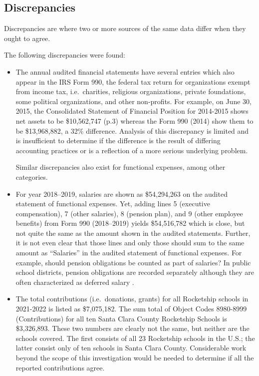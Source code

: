 \newpage
\subsection{Discrepancies}%
\label{sec:discrepancies}\indent%

Discrepancies are where two or more sources of the same data differ when they ought to agree.

The following discrepancies were found:
\begin{itemize}
  \item The annual audited financial statements have several entries which also appear in the IRS Form 990, the federal tax return for organizations exempt from income tax, i.e.\ charities, religious organizations, private foundations, some political organizations, and other non-profits. For example, on June 30, 2015, the Consolidated Statement of Financial Position for 2014-2015 shows net assets to be \$10,562,747 (p.3) whereas the Form 990 (2014) show them to be \$13,968,882, a 32\% difference. Analysis of this discrepancy is limited and is insufficient to determine if the difference is the result of differing accounting practices or is a reflection of a more serious underlying problem.

  Similar discrepancies also exist for functional expenses, among other categories.
 \item For year 2018–2019, salaries are shown as \$54,294,263 on the audited statement of functional expenses. Yet, adding lines 5 (executive compensation), 7 (other salaries), 8 (pension plan), and 9 (other employee benefits) from Form 990 (2018–2019) yields \$54,516,782 which is close, but not quite the same as the amount shown in the audited statements. Further, it is not even clear that those lines and only those should sum to the same amount as ``Salaries'' in the audited statement of functional expenses.  For example, should pension obligations be counted as part of salaries? In public school districts, pension obligations are recorded separately although they are often characterized as deferred salary \parencite{Kagan2022}. 

  \item The total contributions (i.e.\ donations, grants) for all Rocketship schools in 2021-2022 is listed as \$7,075,182. The sum total of Object Codes 8980-8999 (Contributions) for all ten Santa Clara County Rocketship Schools is \$3,326,893. These two numbers are clearly not the same, but neither are the schools covered. The first consists of all 23 Rocketship schools in the U.S.; the latter consist only of ten schools in Santa Clara County. Considerable work beyond the scope of this investigation would be needed to determine if all the reported contributions agree.


\end{itemize}

